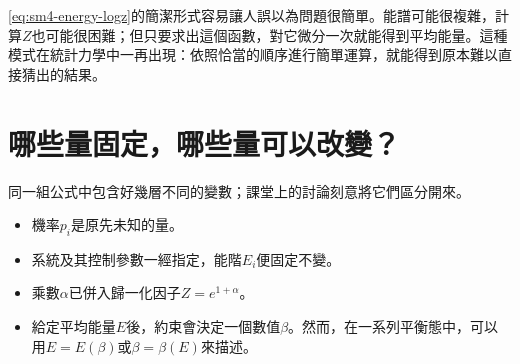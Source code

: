 \eqref{eq:sm4-energy-logz}的簡潔形式容易讓人誤以為問題很簡單。能譜可能很複雜，計算\(Z\)也可能很困難；但只要求出這個函數，對它微分一次就能得到平均能量。這種模式在統計力學中一再出現：依照恰當的順序進行簡單運算，就能得到原本難以直接猜出的結果。

\begin{classroomqa}
\end{classroomqa}

\begin{classroomqa}
\end{classroomqa}

\section{哪些量固定，哪些量可以改變？}

同一組公式中包含好幾層不同的變數；課堂上的討論刻意將它們區分開來。

\begin{itemize}
 \item 機率\(p_i\)是原先未知的量。
 \item 系統及其控制參數一經指定，能階\(E_i\)便固定不變。
 \item 乘數\(\alpha\)已併入歸一化因子\(Z=e^{1+\alpha}\)。
 \item 給定平均能量\(E\)後，約束會決定一個數值\(\beta\)。然而，在一系列平衡態中，可以用\(E=E(\beta)\)或\(\beta=\beta(E)\)來描述。
\end{itemize}

\begin{classroomqa}
\end{classroomqa}

